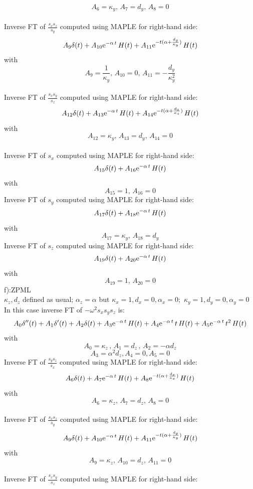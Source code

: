 \documentclass[onecolumn,extra]{gji_modified_cours_UPPA}
\begin{document}
$$A_6=\kappa_y,\,A_7=d_y,\,A_8=0 $$\\
\noindent
Inverse FT of $\frac{s_x s_z}{s_y}$ computed using MAPLE for right-hand side:\\
$$A_9\delta(t) + A_{10} {\rm e}^{-\alpha\,t} \, H(t) + A_{11} {\rm e}^{-t(\alpha+\frac{d_y}{\kappa_y})} \, H(t) $$
with
$$A_9=\frac{1}{\kappa_y},\,A_{10}=0,
\,A_{11}= -\frac{d_y}{\kappa^2_y} $$\\
\noindent
Inverse FT of $\frac{s_x s_y}{s_z}$ computed using MAPLE for right-hand side:\\
$$ A_{12}\delta(t) + A_{13} {\rm e}^{-\alpha\,t} \, H(t) + A_{14} {\rm e}^{-t(\alpha+\frac{d_z}{\kappa_z})} \, H(t) $$
with
$$A_{12}=\kappa_y ,\,A_{13}=d_y,
\,A_{14}=0$$\\
\noindent
Inverse FT of $s_x$ computed using MAPLE for right-hand side:
$$A_{15}\delta(t) + A_{16} {\rm e}^{-\alpha \,t} \, H(t) $$
with
$$A_{15}= 1, \, A_{16}=0 $$
\noindent
Inverse FT of $s_y$ computed using MAPLE for right-hand side:
$$A_{17}\delta(t) + A_{18} {\rm e}^{-\alpha \,t} \, H(t) $$
with
$$A_{17}= \kappa_y, \, A_{18}=d_y $$
\noindent
Inverse FT of $s_z$ computed using MAPLE for right-hand side:
$$A_{19}\delta(t) + A_{20} {\rm e}^{-\alpha \,t} \, H(t) $$
with
$$A_{19}= 1, \, A_{20}=0 $$
f):ZPML\\
$\kappa_z,d_z$ defined as usual; $\alpha_z=\alpha$ but $\kappa_x = 1 ,d_x= 0,\alpha_x= 0$;$\,$ $\kappa_y = 1 ,d_y= 0,\alpha_y= 0$\\
In this case inverse FT of $-\omega^2 s_x s_y s_z$ is:
$$A_0 \delta''(t) + A_1 \delta'(t) + A_2 \delta(t)
+ A_3 {\rm e}^{-\alpha\,t} \, H(t)
+ A_4 {\rm e}^{-\alpha\,t} \,t\, H(t)
+ A_5 {\rm e}^{-\alpha\,t} \,t^{2} \,H(t)$$
with
$$A_0 = \kappa_z \, , \, A_1 =d_z\, , \,A_2 = -\alpha d_z $$
$$A_3= \alpha ^2 d_z , A_4= 0, A_5=0 $$
\noindent
Inverse FT of $\frac{s_y s_z}{s_x}$ computed using MAPLE for right-hand side:\\
$$A_6\delta(t) + A_7 {\rm e}^{-\alpha\,t} \, H(t) + A_8 {\rm e}^{-t(\alpha+\frac{d_x}{\kappa_x})} \, H(t) $$
with
$$A_6=\kappa_z,\,A_7=d_z,\,A_8=0 $$\\
\noindent
Inverse FT of $\frac{s_x s_z}{s_y}$ computed using MAPLE for right-hand side:\\
$$A_9\delta(t) + A_{10} {\rm e}^{-\alpha\,t} \, H(t) + A_{11} {\rm e}^{-t(\alpha+\frac{d_y}{\kappa_y})} \, H(t) $$
with
$$A_9=\kappa_z,\,A_{10}=d_z,
\,A_{11}=0  $$\\
\noindent
Inverse FT of $\frac{s_x s_y}{s_z}$ computed using MAPLE for right-hand side:\\
\end{document}
